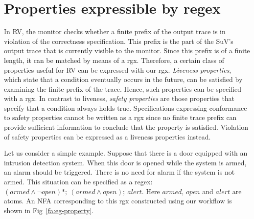 \section{Properties expressible by regex}
In \gls{RV}, the monitor checks whether a finite prefix of the output
trace is in violation of the correctness specification.
This prefix is the part of the \gls{SuV}'s output trace that is
currently visible to the monitor.
Since this prefix is of a finite length, it can be matched by means of a
\gls{rgx}.
%
%
Therefore, a certain class of properties useful for \gls{RV} can be
expressed with our \gls{rgx}.
\emph{Liveness properties}, which state that a condition eventually
occurs in the future, can be satisfied by examining the finite prefix
of the trace.
Hence, such properties can be specified with a \gls{rgx}.
In contrast to liveness, \emph{safety properties} are those properties
that specify that a condition always holds true.
Specifications expressing conformance to safety properties cannot be
written as a \gls{rgx} since no finite trace prefix can provide
sufficient information to conclude that the property is satisfied.
Violation of safety properties can be expressed as a liveness
properties instead.

Let us consider a simple example. Suppose that there is a door equipped
with an intrusion detection system. When this door is opened while the
system is armed, an alarm should be triggered. There is no need for
alarm if the system is not armed.
This situation can be specified as a regex:
$(armed \land \lnot open)*;\ (armed \land open);\ alert$.
Here $armed$, $open$ and $alert$ are atoms.
An \gls{NFA} corresponding to this \gls{rgx} constructed using our
workflow is shown in Fig~\ref{fa:eg-property}.
%


